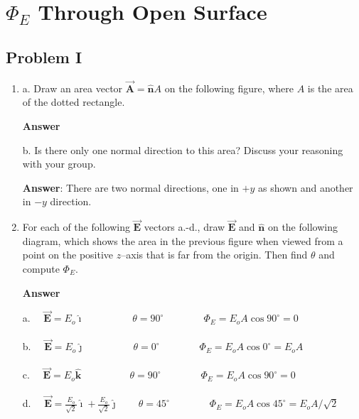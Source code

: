 \documentclass{article}
\newcommand{\ds}[0]{\displaystyle}
\newcommand{\ihat}[0]{\hat{\boldsymbol{\imath}}}
\newcommand{\jhat}[0]{\hat{\boldsymbol{\jmath}}}
\newcommand{\khat}[0]{\hat{\boldsymbol{k}}}
\newcommand{\bfvec}[1]{\vec{\mathbf{#1}}}
\begin{document}
\newpage

\section{$\Phi_E$ Through Open Surface}

\subsection{Problem I}

\begin{enumerate}

  \item a. Draw an area vector $\bfvec{A}=\hat{\mathbf{n}}A$ on the following figure, where $A$ is the area of the dotted rectangle.

        \ifsolutions
        \textbf{Answer}

        
        \else

        
        \fi

        b. Is there only one normal direction to this area? Discuss your reasoning with your group.

        \ifsolutions
        \textbf{Answer}: There are two normal directions, one in $+y$ as shown and another in $-y$ direction.
        \else
        \vskip 72pt
        \fi

  \item For each of the following $\bfvec{E}$ vectors a.-d., draw $\bfvec{E}$ and $\hat{\mathbf{n}}$ on the following diagram, which shows the area in the previous figure when viewed from a point on the positive $z$--axis that is far from the origin. Then find $\theta$ and compute $\Phi_E$.

        \ifsolutions
        \textbf{Answer}

        

        a. $\quad\ds\bfvec{E}=E_o\ihat\qquad\phantom{+\frac{E_o}{\sqrt{2}}\jhat}\theta=90^\circ\qquad\qquad\Phi_E=E_oA\cos 90^\circ = 0$

        b. $\quad\ds\bfvec{E}=E_o\jhat\qquad\phantom{+ \frac{E_o}{\sqrt{2}}\jhat}\theta=0^\circ\qquad\qquad\Phi_E=E_oA\cos 0^\circ=E_oA$ 

        c. $\quad\ds\bfvec{E}=E_o\khat\qquad\phantom{+\frac{E_o}{\sqrt{2}}\jhat}\theta=90^\circ\qquad\qquad\Phi_E=E_oA\cos 90^\circ=0$ 

        d. $\quad\ds\bfvec{E}=\frac{E_o}{\sqrt{2}}\ihat + \frac{E_o}{\sqrt{2}}\jhat\qquad\theta=45^\circ\qquad\qquad\Phi_E=E_o A\cos 45^\circ=E_oA/\sqrt{2}$


\end{enumerate}
\end{document}
